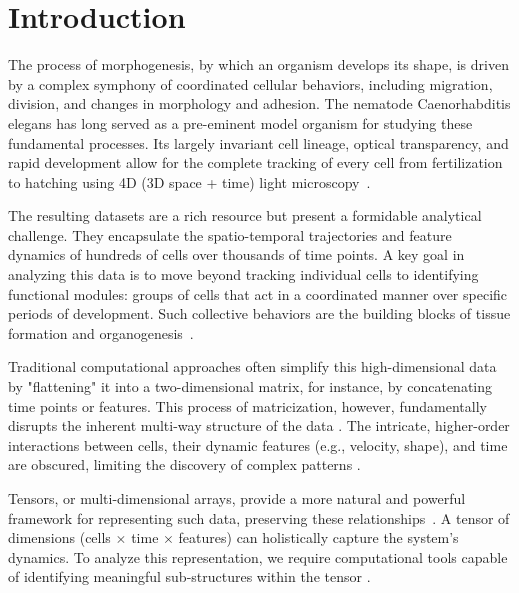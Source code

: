 \documentclass[unnumsec,webpdf,modern,large,namedate]{oup-authoring-template}%
\theoremstyle{thmstyleone}\newtheorem{theorem}{Theorem}
\theoremstyle{thmstyletwo}\newtheorem{example}{Example}
\theoremstyle{thmstylethree}\newtheorem{definition}{Definition}
\begin{document}

\maketitle

\section{Introduction}

The process of morphogenesis, by which an organism develops its shape, is driven by a complex symphony of coordinated cellular behaviors, including migration, division, and changes in morphology and adhesion. The nematode Caenorhabditis elegans has long served as a pre-eminent model organism for studying these fundamental processes. Its largely invariant cell lineage, optical transparency, and rapid development allow for the complete tracking of every cell from fertilization to hatching using 4D (3D space + time) light microscopy~\citep{kaletta2006FindingFunctionNovel,hwang2003CaenorhabditisElegansEarly}.

The resulting datasets are a rich resource but present a formidable analytical challenge. They encapsulate the spatio-temporal trajectories and feature dynamics of hundreds of cells over thousands of time points. A key goal in analyzing this data is to move beyond tracking individual cells to identifying functional modules: groups of cells that act in a coordinated manner over specific periods of development. Such collective behaviors are the building blocks of tissue formation and organogenesis~\citep{setty2008FourdimensionalRealisticModeling,carvalho2020game}.

Traditional computational approaches often simplify this high-dimensional data by "flattening" it into a two-dimensional matrix, for instance, by concatenating time points or features. This process of matricization, however, fundamentally disrupts the inherent multi-way structure of the data \citep{kolda2009TensorDecompositionsApplications}. The intricate, higher-order interactions between cells, their dynamic features (e.g., velocity, shape), and time are obscured, limiting the discovery of complex patterns \citep{cichocki2015TensorDecompositionsSignal}.

Tensors, or multi-dimensional arrays, provide a more natural and powerful framework for representing such data, preserving these relationships~\citep{sun2008IncrementalTensorAnalysis,kolda2009TensorDecompositionsApplications}. A tensor of dimensions (cells $\times$ time $\times$ features) can holistically capture the system's dynamics. To analyze this representation, we require computational tools capable of identifying meaningful sub-structures within the tensor \citep{sidiropoulos2017TensorDecompositionSignal}.
\end{document}
